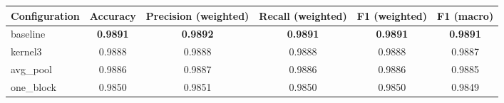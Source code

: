 \begin{tabular}{lccccc}
\hline
Configuration & Accuracy & Precision (weighted) & Recall (weighted) & F1 (weighted) & F1 (macro) \\
\hline
baseline & \textbf{0.9891} & \textbf{0.9892} & \textbf{0.9891} & \textbf{0.9891} & \textbf{0.9891} \\
kernel3 & 0.9888 & 0.9888 & 0.9888 & 0.9888 & 0.9887 \\
avg\_pool & 0.9886 & 0.9887 & 0.9886 & 0.9886 & 0.9885 \\
one\_block & 0.9850 & 0.9851 & 0.9850 & 0.9850 & 0.9849 \\
\hline
\end{tabular}
